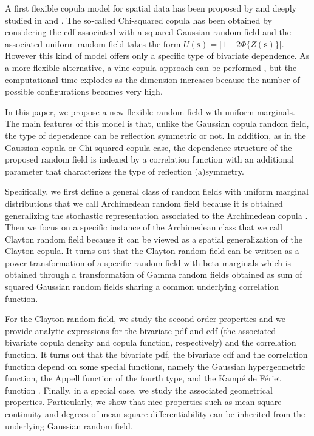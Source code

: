 \documentclass[times,sort&compress,3p]{elsarticle}
\theoremstyle{plain}%
\theoremstyle{definition}
\def\ss{\bm{s}}
\begin{document}
A   first flexible copula model for spatial data has been  proposed by   \cite{bardossy2006copula} and deeply studied in
\cite{QUESSY201640} and
 \cite{Quessy2019}. The so-called Chi-squared copula has been obtained  by considering the cdf associated with a squared Gaussian random field and the associated uniform random field takes the form $U(\ss)=|1-2\Phi\{Z(\ss)\}|$.  However this kind of model offers only a specific type of bivariate dependence.
As a more flexible alternative, a vine copula approach can be performed \citep{ERHARDT201574,graler2014modelling}, but the computational time explodes as the dimension increases because the number of possible configurations becomes very high.



In this paper, we propose a new flexible random field with uniform marginals. The main features of this model is that, unlike the Gaussian copula random field, the type of dependence can be reflection symmetric or not. In addition, as in the Gaussian copula or Chi-squared copula  case, the dependence structure of the proposed random field is indexed by a correlation function with an additional parameter that characterizes the type of reflection (a)symmetry.


 Specifically, we first define a general class of random fields  with uniform marginal distributions that we call Archimedean  random field because it is  obtained   generalizing  the stochastic representation  associated to the  Archimedean copula \citep{Genest1986,Joe:2014}. Then we focus on a specific instance of the Archimedean  class  that we call Clayton random field because it can be viewed as a spatial generalization of the Clayton copula.
It turns out that the Clayton  random field can be written as a power transformation  of a specific random field with beta marginals which is  obtained  through a transformation  of Gamma random fields obtained as sum of squared Gaussian random fields sharing a common underlying correlation function.


For the Clayton random field, we study the second-order properties and  we provide analytic expressions for the bivariate pdf
and cdf (the associated  bivariate copula density and copula function, respectively) and the correlation function. It turns out that the bivariate pdf, the bivariate cdf  and the correlation function depend on some special functions, namely the Gaussian hypergeometric function, the Appell function of the fourth type, and the Kampé de Fériet function \citep{Gradshteyn:Ryzhik:2007}. Finally, in a special case, we study the associated geometrical properties. Particularly, we show that nice properties such as  mean-square continuity and degrees of mean-square differentiability can be inherited from the underlying Gaussian random field.
\end{document}
